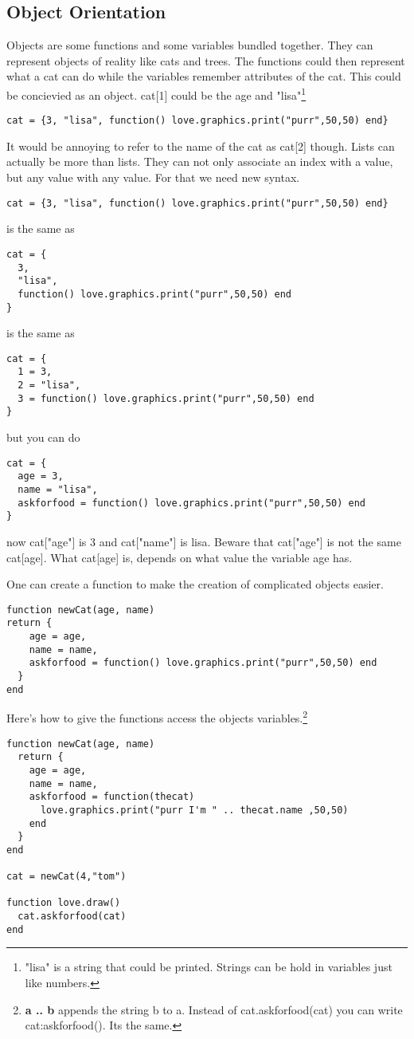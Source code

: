 \documentclass[a4paper, 11pt]{article}
\begin{document}
\subsection{Object Orientation}
Objects are some functions and some variables bundled together. They can represent objects of reality like cats and trees.
The functions could then represent what a cat can do while the variables remember attributes of the cat.
This could be concievied as an object. cat[1] could be the age and "lisa"\footnote{"lisa" is a string that could be printed. Strings can be hold in variables just like numbers.} 
\begin{lstlisting}
cat = {3, "lisa", function() love.graphics.print("purr",50,50) end}
\end{lstlisting}
It would be annoying to refer to the name of the cat as cat[2] though.
Lists can actually be more than lists. They can not only associate an index with a value, but any value with any value.
For that we need new syntax.
\begin{lstlisting}
cat = {3, "lisa", function() love.graphics.print("purr",50,50) end}
\end{lstlisting}
is the same as
\begin{lstlisting}
cat = {
  3,
  "lisa",
  function() love.graphics.print("purr",50,50) end
}
\end{lstlisting}
is the same as
\begin{lstlisting}
cat = {
  1 = 3,
  2 = "lisa",
  3 = function() love.graphics.print("purr",50,50) end
}
\end{lstlisting}
but you can do
\begin{lstlisting}
cat = {
  age = 3,
  name = "lisa",
  askforfood = function() love.graphics.print("purr",50,50) end
}
\end{lstlisting}
now cat["age"] is 3 and cat["name"] is lisa.
Beware that cat["age"] is not the same cat[age]. What cat[age] is, depends on what value the variable age has.

One can create a function to make the creation of complicated objects easier.

\begin{lstlisting}
function newCat(age, name)
return {
    age = age,
    name = name,
    askforfood = function() love.graphics.print("purr",50,50) end
  }
end
\end{lstlisting}
Here's how to give the functions  access the objects variables.\footnote{\textbf{a .. b} appends the string b to a. Instead of cat.askforfood(cat) you can write cat:askforfood(). Its the same.}
\begin{lstlisting}
function newCat(age, name)
  return {
    age = age,
    name = name,
    askforfood = function(thecat)
      love.graphics.print("purr I'm " .. thecat.name ,50,50)
    end
  }
end

cat = newCat(4,"tom")

function love.draw()
  cat.askforfood(cat)
end
\end{lstlisting}



\fi
\end{document}

